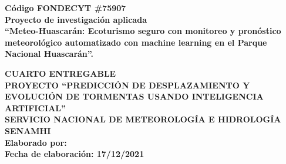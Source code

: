 \begin{titlepage}
	
	\begin{center}
		\vspace*{2 mm}
		{\small \textbf{Código FONDECYT \#75907}}\\
		\vspace{2 cm}
		{\large \textbf{Proyecto de investigación aplicada}}\\
		\vspace{5 mm}
		{\large \textbf{``Meteo-Huascarán: Ecoturismo seguro con monitoreo y 
    pronóstico meteorológico automatizado con machine learning en el Parque 
    Nacional Huascarán”.}}\\
		\vspace{3 cm}

		\doublespacing  
		{\LARGE \textbf{CUARTO ENTREGABLE} }\\

		{\LARGE \textbf{PROYECTO ``PREDICCIÓN DE DESPLAZAMIENTO Y EVOLUCIÓN DE 
    TORMENTAS USANDO INTELIGENCIA ARTIFICIAL”} }\\
		
		
		\vspace{3 cm}	
		{\LARGE \textbf{SERVICIO NACIONAL DE METEOROLOGÍA E HIDROLOGÍA} }\\
		{\LARGE \textbf{SENAMHI} }\\
		\vspace{2 cm}
		{\large \textbf{Elaborado por: \@author} }\\
		\vspace{5 mm}	
		{\large \textbf{Fecha de elaboración: 17/12/2021} }\\

	\end{center}

\end{titlepage}